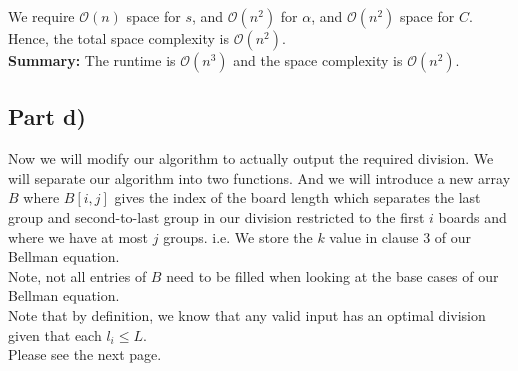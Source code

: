 \documentclass[12pt]{article}
\begin{document}
We require $\mathcal{O}(n)$ space for $s$, and $\mathcal{O}(n^2)$ for $\alpha$, and $\mathcal{O}(n^2)$ space for $C$. Hence, the total space complexity is $\mathcal{O}(n^2)$. \\

\textbf{Summary:} The runtime is $\mathcal{O}(n^3)$ and the space complexity is $\mathcal{O}(n^2)$. 

\subsection*{Part d)}

Now we will modify our algorithm to actually output the required division. We will separate our algorithm into two functions. And we will introduce a new array $B$ where $B[i,j]$ gives the index of the board length which separates the last group and second-to-last group in our division restricted to the first $i$ boards and where we have at most $j$ groups. i.e. We store the $k$ value in clause 3 of our Bellman equation. \\

Note, not all entries of $B$ need to be filled when looking at the base cases of our Bellman equation. \\

Note that by definition, we know that any valid input has an optimal division given that each $l_i \leq L$. \\

Please see the next page. 

\newpage
\end{document}
